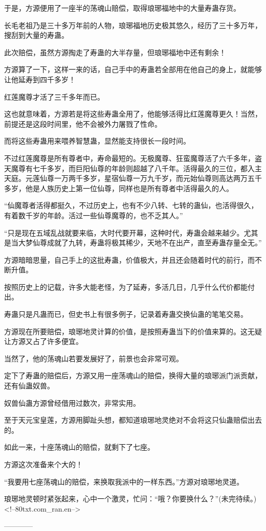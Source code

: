 \begin{this_body}
于是，方源便用了一座半的荡魂山赔偿，取得琅琊福地中的大量寿蛊存货。

长毛老祖乃是三十多万年前的人物，琅琊福地历史极其悠久，经历了三十多万年，搜刮到大量的寿蛊。

此次赔偿，虽然方源掏走了寿蛊的大半存量，但琅琊福地中还有剩余！

方源算了一下，这样一来的话，自己手中的寿蛊若全部用在他自己的身上，就能够让他延寿到四千多岁！

红莲魔尊才活了三千多年而已。

这也就意味着，方源若是将这些寿蛊全用了，他能够活得比红莲魔尊更久！当然，前提还是这段时间里，他不会被外力屠戮了性命。

而将这些寿蛊用来喂养智慧蛊，显然能支持很长一段时间。

不过红莲魔尊是所有尊者中，寿命最短的。无极魔尊、狂蛮魔尊活了六千多年，盗天魔尊有七千多岁，而巨阳仙尊的年龄则超越了八千年。活得最久的三位，都入主天庭。元莲仙尊一万两千多岁，星宿仙尊一万九千岁，而元始仙尊则高达两万五千多岁，他是人族历史上第一位仙尊，同样也是所有尊者中活得最久的人。

“仙魔尊者活得都挺久，不过历史上，也有不少八转、七转的蛊仙，也活得很久，有着数千岁的年龄。活过一些仙尊魔尊的，也不乏其人。”

“只是现在五域乱战就要来临，大时代要开幕，这种时代，寿蛊会越来越少。尤其是当大梦仙尊成就了九转，寿蛊将极其稀少，天地不在出产，直至寿蛊存量全无。”

方源暗暗思量，自己手上的这批寿蛊，价值极大，并且还会随着时代的前行，而不断升值。

按照历史上的记载，许多大能老怪，为了延寿，多活几日，几乎什么代价都能付出。

寿蛊只是凡蛊而已，但史书上有很多例子，记录着寿蛊交换仙蛊的笔笔交易。

方源现在所要赔偿，琅琊地灵计算的价值，是按照寿蛊当下的价值来算的。这无疑让方源又占了许多便宜。

当然了，他的荡魂山若要发展好了，前景也会非常可观。

定下了寿蛊的赔偿后，方源又用一座荡魂山的赔偿，换得大量的琅琊派门派贡献，还有仙蛊奴兽。

奴兽仙蛊方源曾经借用过数次，非常实用。

至于天元宝皇莲，方源用脚趾头想，都知道琅琊地灵绝对不会将这只仙蛊赔偿出去的。

如此一来，十座荡魂山的赔偿，就剩下了七座。

方源这次准备来个大的！

“我要用七座荡魂山的赔偿，来换取我派中的一样东西。”方源对琅琊地灵道。

琅琊地灵顿时紧张起来，心中一个激灵，忙问：“哦？你要换什么？”(未完待续。)<!--80txt.com\_ran.en-->

------------

\end{this_body}


